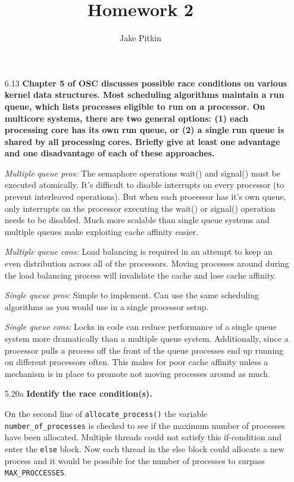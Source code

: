 \documentclass[11pt, letterpaper]{hw}
\title{Homework 2}
\institute{University of Utah}
\author{Jake Pitkin}
\begin{document}
\maketitle

\begin{enumerate}

\item [6.13] \textbf{Chapter 5 of OSC discusses possible race conditions on various kernel data structures. Most scheduling algorithms maintain a run queue, which lists processes eligible to run on a processor. On multicore systems, there are two general options: (1) each processing core has its own run queue, or (2) a single run queue is shared by all processing cores. Briefly give at least one advantage and one disadvantage of each of these approaches.}

{\it Multiple queue pros:} The semaphore operations wait() and signal() must be executed atomically. It's difficult to disable interrupts on every processor (to prevent interleaved operations). But when each processor has it's own queue, only interrupts on the processor executing the wait() or signal() operation needs to be disabled. Much more scalable than single queue systems and multiple queues make exploiting cache affinity easier.

{\it Multiple queue cons:} Load balancing is required in an attempt to keep an even distribution across all of the processors. Moving processes around during the load balancing process will invalidate the cache and lose cache affinity.

{\it Single queue pros:} Simple to implement. Can use the same scheduling algorithms as you would use in a single processor setup.

{\it Single queue cons:} Locks in code can reduce performance of a single queue system more dramatically than a multiple queue system. Additionally, since a processor pulls a process off the front of the queue processes end up running on different processors often. This makes for poor cache affinity unless a mechanism is in place to promote not moving processes around as much.

\item [5.20a] \textbf{Identify the race condition(s).}

On the second line of {\tt allocate\_process()} the variable {\tt number\_of\_processes} is checked to see if the maximum number of processes have been allocated. Multiple threads could not satisfy this if-condition and enter the {\tt else} block. Now each thread in the else block could allocate a new process and it would be possible for the number of processes to surpass {\tt MAX\_PROCCESSES}.


\end{enumerate}
\end{document}
